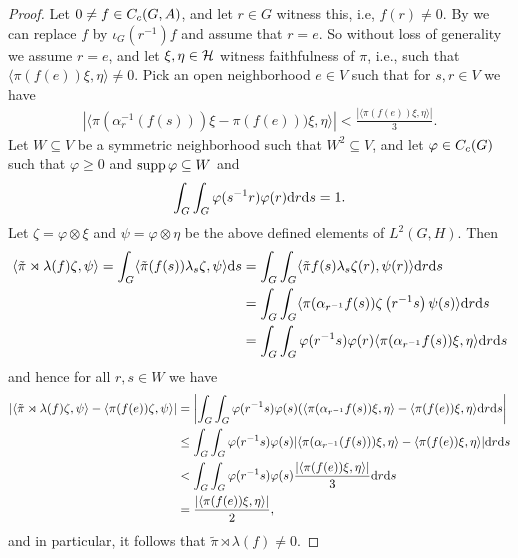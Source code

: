 \begin{proof}
Let $0 \neq f \in C_c(G,A)$, and let $r \in G$ witness this, i.e, $f(r) \neq 0$. By  we can replace $f$ by $\iota_G(r^{-1})f$ and assume that $r=e$. So without loss of generality we assume $r = e$, and let $\xi, \eta \in \mathcal{H}$ witness faithfulness of $\pi$, i.e., such that $\langle \pi ( f(e)) \xi, \eta \rangle \neq 0$. Pick an open neighborhood $e \in V$ such that for $s,r \in V$ we have 
\begin{align*}
	| \langle \pi(\alpha_r^{-1}(f(s))) \xi  - \pi(f(e)))\xi , \eta \rangle|  < \frac{| \langle \pi (f(e)) \xi , \eta\rangle|}{3}.
\end{align*}
Let $W \subseteq V$ be a symmetric neighborhood such that $W^2 \subseteq V$, and let $\varphi \in C_c(G)$ such that $\varphi \geq 0$ and $\operatorname{supp} \varphi \subseteq W$ and
\begin{align*}
\int_G \int_G \varphi(s^{-1}r) \varphi(r) \mathrm{d} r \mathrm{d} s = 1.
\end{align*}
Let $\zeta = \varphi \otimes \xi$ and $\psi = \varphi \otimes \eta$ be the above defined elements of $L^2(G,H)$. Then
\begin{align*}
\langle \tilde{ \pi } \rtimes \lambda (f) \zeta, \psi \rangle  =  \int_G \langle \tilde{\pi}(f(s)) \lambda_s \zeta , \psi\rangle \mathrm{d} s &= \int_G \int_G \langle \tilde{\pi} f(s) \lambda_s \zeta(r) , \psi(r) \rangle \mathrm{d} r \mathrm{d} s\\
&= \int_G \int_G \langle \pi(\alpha_{r^{-1}}f(s)) \zeta\left( r^{-1}s \right) \psi(s) \rangle \mathrm{d} r \mathrm{d} s\\
&= \int_G \int_G \varphi(r^{-1}s) \varphi(r) \langle \pi(\alpha_{r^{-1}}f(s)) \xi , \eta \rangle \mathrm{d} r \mathrm{d} s
\end{align*}
and hence for all $r,s \in W$ we have
\begin{align*}
\left | \langle\tilde{\pi} \rtimes \lambda (f) \zeta , \psi \rangle - \langle \pi(f(e)) \zeta , \psi \rangle\right | &=  \left |  \int_G \int_G\varphi(r^{-1}s) \varphi (s) (\langle \pi(\alpha_{r^{-1}} f(s)) \xi , \eta \rangle - \langle \pi(f(e)) \xi , \eta \rangle  \mathrm{d} r \mathrm{d} s \right | \\
&\leq \int_G \int_G \varphi(r^{-1}s ) \varphi (s) | \langle \pi(\alpha_{r^{-1}}(f(s))) \xi , \eta\rangle - \langle \pi(f(e)) \xi , \eta \rangle | \mathrm{d} r \mathrm{d} s \\
&< \int_G \int_G \varphi(r^{-1}s) \varphi(s) \frac{| \langle \pi(f(e)) \xi, \eta \rangle|}{3} \mathrm{d} r \mathrm{d} s \\
&= \frac{| \langle \pi(f(e)) \xi , \eta \rangle|} {2},
\end{align*}
and in particular, it follows that $\tilde{\pi} \rtimes \lambda (f) \neq 0$.
\end{proof}

